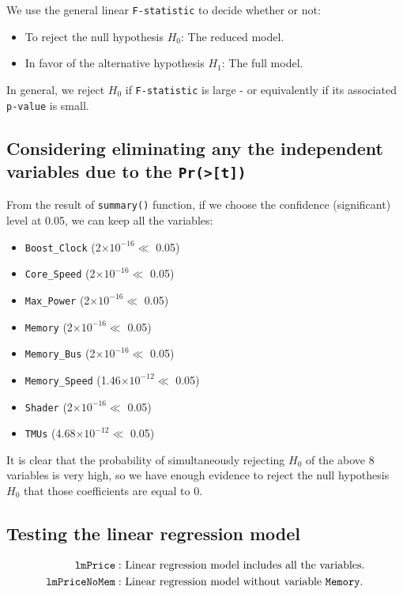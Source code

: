 \documentclass[a4paper]{article}
\begin{document}
\begin{enumerate}
\begin{itemize}
\begin{itemize}
            We use the general linear \verb|F-statistic| to decide whether or not:
            \begin{itemize}
                \item To reject the null hypothesis $H_0$: The reduced model.
                \item In favor of the alternative hypothesis $H_1$: The full model.
            \end{itemize}
            In general, we reject $H_0$ if \verb|F-statistic| is large - or equivalently if its associated \verb|p-value| is small. 
        \end{itemize}
    \end{itemize}
\end{enumerate}
\subsection{Considering eliminating any the independent variables due to the \texttt{Pr(>[t])}}
From the result of \verb|summary()| function, if we choose the confidence (significant) level at 0.05, we can keep all the variables:
\begin{itemize}
    \item \verb|Boost_Clock| (2$\times 10^{-16} \ll$ 0.05)
    \item \verb|Core_Speed| (2$\times 10^{-16} \ll$ 0.05)
    \item \verb|Max_Power| (2$\times 10^{-16} \ll$ 0.05)
    \item \verb|Memory| (2$\times 10^{-16} \ll$ 0.05)
    \item \verb|Memory_Bus| (2$\times 10^{-16} \ll$ 0.05)
    \item \verb|Memory_Speed| (1.46$\times 10^{-12} \ll$ 0.05)
    \item \verb|Shader| (2$\times 10^{-16} \ll$ 0.05)
    \item \verb|TMUs| (4.68$\times 10^{-12} \ll$ 0.05)
\end{itemize}
It is clear that the probability of simultaneously rejecting $H_0$ of the above 8 variables is very high, so we have enough evidence to reject the null hypothesis $H_0$ that those coefficients are equal to 0.


\subsection{Testing the linear regression model}
\begin{align*}
    \texttt{lmPrice}: &\text{ Linear regression model includes all the variables}.\\
    \texttt{lmPriceNoMem}: &\text{ Linear regression model without variable \texttt{Memory}}.
\end{align*}
\end{document}
